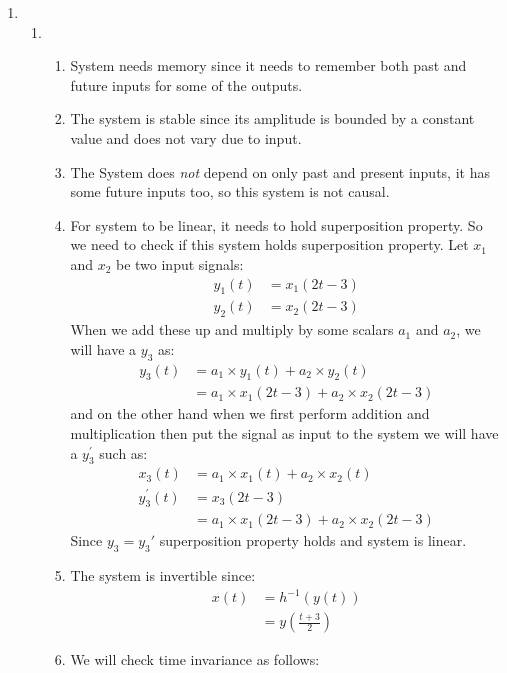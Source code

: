 \documentclass[10pt,a4paper, margin=1in]{article}
\begin{document}
\begin{enumerate}
\newpage

\item 
    \begin{enumerate}
    \item 
        \begin{enumerate}
        \item System needs memory since it needs to remember both past and future inputs for some of the outputs.
        \item The system is stable since its amplitude is bounded by a constant value and does not vary due to input.
        \item The System does \textit{not} depend on only past and present inputs, it has some future inputs too, so this system is not causal.
        \item For system to be linear, it needs to hold superposition property. So we need to check if this system holds superposition property. Let $x_1$ and $x_2$ be two input signals:
            \begin{align*}
            y_1(t) & =x_1(2t-3) \\
            y_2(t) & =x_2(2t-3)
            \end{align*}
            When we add these up and multiply by some scalars $a_1$ and $a_2$, we will have a $y_3$ as:
            \begin{align*}
            y_3(t)&= a_1 \times y_1(t) + a_2 \times y_2(t) \\
                  &= a_1 \times x_1(2t-3)+ a_2 \times x_2(2t-3)
            \end{align*}
            and on the other hand when we first perform addition and multiplication then put the signal as input to the system we will have a $y_3^{'}$ such as:
            \begin{align*}
                x_3(t)&=a_1\times x_1(t) + a_2\times x_2(t) \\
                y_3^{'}(t)&=x_3(2t-3)\\
                &=a_1\times x_1(2t-3) + a_2\times x_2(2t-3)
            \end{align*}
            Since $y_3 = y_3'$ superposition property holds and system is linear.
        \item The system is invertible since:
        \begin{align*}
        x(t) &= h^{-1}(y(t)) \\
             &= y(\frac{t+3}{2})
        \end{align*}
        \item We will check time invariance as follows:

\end{enumerate}
\end{enumerate}
\end{enumerate}
\end{document}
